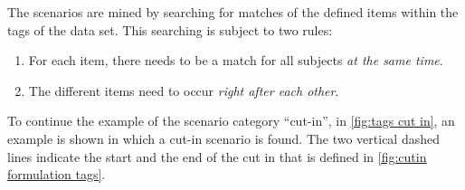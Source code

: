 The scenarios are mined by searching for matches of the defined items within the tags of the data set. 
This searching is subject to two rules:
\begin{enumerate}
	\item For each item, there needs to be a match for all subjects \emph{at the same time}.
	\item The different items need to occur \emph{right after each other}. 
\end{enumerate}\cendb
\cstartd To continue the example of the scenario category ``cut-in'', in \cref{fig:tags cut in}, an example is shown in which a cut-in scenario is found. \cendd
\cstartb The two vertical dashed lines indicate the start and the end of the cut in that is defined in \cref{fig:cutin formulation tags}.
\cendb

\begin{figure*}
	\centering
	
	\caption{\cstartc Example of tags describing a cut in. Note that only the tags that are relevant for the cut in, as defined in \cref{fig:cutin formulation tags}, are shown.\cendc}
	\label{fig:tags cut in}
\end{figure*}



